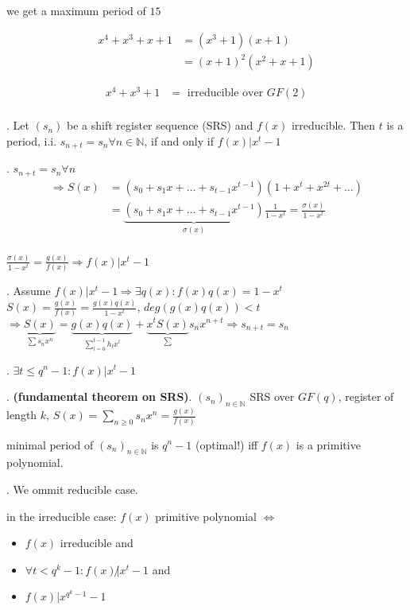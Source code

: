 we get a maximum period of $15$

\begin{align*}
  x^4 + x^3 + x + 1 &= (x^3 + 1)(x+1)\\
    &= (x+1)^2(x^2+x+1)
\end{align*}

\begin{align*}
  x^4 + x^3 + 1 &= \text{ irreducible over $GF(2)$}\\
\end{align*}

\Theorem.
Let $(s_n)$ be a shift register sequence (SRS) and $f(x)$ irreducible. Then $t$ is a period, i.i. $s_{n+t}= s_n \forall n \in \mathbb{N}$, if and only if $f(x) | x^t-1$

\ProofForward.
$s_{n+t}= s_n \forall n$\\
\begin{align*}
  \Rightarrow S(x) &= (s_0+s_1x+ \ldots + s_{t-1}x^{t-1})(1+x^t+x^{2t}+\ldots)\\
                   &= \underbrace{(s_0+s_1x+ \ldots + s_{t-1}x^{t-1})}_{\sigma(x)} \frac{1}{1-x^t} = \frac{\sigma(x)}{1-x^t}\\
\end{align*}

$\frac{\sigma(x)}{1-x^t} = \frac{g(x)}{f(x)} \Rightarrow f(x) | x^t-1$

\ProofBackward.
Assume $f(x) | x^t-1 \Rightarrow \exists q(x): f(x)q(x) = 1-x^t$\\
$S(x) = \frac{g(x)}{f(x)} = \frac{g(x)q(x)}{1-x^t}$, $deg(g(x)q(x))<t$\\
$\Rightarrow \underbrace{S(x)}_{\sum s_n x^n} = \underbrace{g(x)q(x)}_{\sum_{l=0}^{t-1}h_lx^l} + \underbrace{x^t S(x)}_\sum s_n x^{n+t} \Rightarrow s_{n+t}= s_n$

\Corollary.
$\exists t \leq q^n -1: f(x) | x^t-1$

\Theorem. 
\textbf{(fundamental theorem on SRS)}.
$(s_n)_{n\in \mathbb{N}}$ SRS over $GF(q)$, register of length $k$, $S(x) = \sum_{n \geq 0} s_n x^n = \frac{g(x)}{f(x)}$

minimal period of $(s_n)_{n\in \mathbb{N}}$ is $q^n -1$ (optimal!) iff $f(x)$ is a primitive polynomial.

\Proof.
We ommit reducible case. 

in the irreducible case: $f(x)$ primitive polynomial $\iff$ 
\begin{itemize}
  \item $f(x)$ irreducible and
  \item $\forall t < q^k -1 : f(x) \not| x^t-1$ and 
  \item $f(x) | x^{q^k-1}-1$
\end{itemize}

